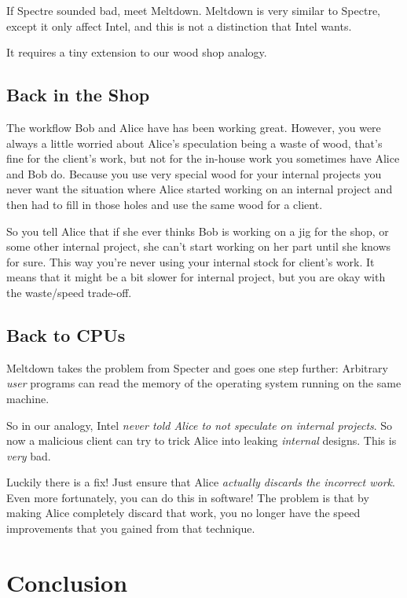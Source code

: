 \documentclass{article}
\begin{document}
If Spectre sounded bad, meet Meltdown. Meltdown is very similar to Spectre,
except it only affect Intel, and this is not a distinction that Intel wants.

It requires a tiny extension to our wood shop analogy.

\subsection*{Back in the Shop}

The workflow Bob and Alice have has been working great. However, you were
always a little worried about Alice's speculation being a waste of wood, that's
fine for the client's work, but not for the in-house work you sometimes have
Alice and Bob do. Because you use very special wood for your internal projects
you never want the situation where Alice started working on an internal project
and then had to fill in those holes and use the same wood for a client.

So you tell Alice that if she ever thinks Bob is working on a jig for the shop,
or some other internal project, she can't start working on her part until she
knows for sure. This way you're never using your internal stock for client's
work. It means that it might be a bit slower for internal project, but you
are okay with the waste/speed trade-off.

\subsection*{Back to CPUs}

Meltdown takes the problem from Specter and goes one step further: Arbitrary
\emph{user} programs can read the memory of {the operating system} running on
the same machine.

So in our analogy, Intel \emph{never told Alice to not speculate on internal
projects}. So now a malicious client can try to trick Alice into leaking
\emph{internal} designs. This is \emph{very} bad.

Luckily there is a fix! Just ensure that Alice \emph{actually discards the
incorrect work}. Even more fortunately, you can do this in software! The
problem is that by making Alice completely discard that work, you no longer
have the speed improvements that you gained from that technique.

\section{Conclusion}
\end{document}
